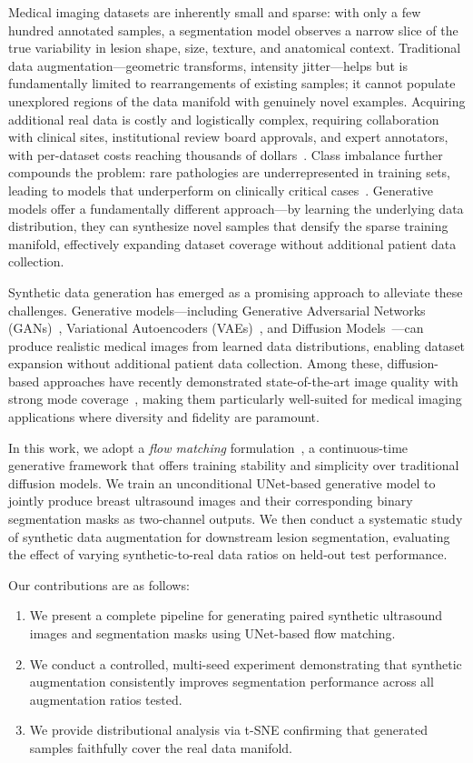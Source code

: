 \documentclass[twocolumn]{article}
\begin{document}
Medical imaging datasets are inherently small and sparse: with only a few hundred annotated samples, a segmentation model observes a narrow slice of the true variability in lesion shape, size, texture, and anatomical context. Traditional data augmentation---geometric transforms, intensity jitter---helps but is fundamentally limited to rearrangements of existing samples; it cannot populate unexplored regions of the data manifold with genuinely novel examples. Acquiring additional real data is costly and logistically complex, requiring collaboration with clinical sites, institutional review board approvals, and expert annotators, with per-dataset costs reaching thousands of dollars~\cite{willemink2020}. Class imbalance further compounds the problem: rare pathologies are underrepresented in training sets, leading to models that underperform on clinically critical cases~\cite{johnson2019}. Generative models offer a fundamentally different approach---by learning the underlying data distribution, they can synthesize novel samples that densify the sparse training manifold, effectively expanding dataset coverage without additional patient data collection.

Synthetic data generation has emerged as a promising approach to alleviate these challenges. Generative models---including Generative Adversarial Networks (GANs)~\cite{goodfellow2014}, Variational Autoencoders (VAEs)~\cite{kingma2014}, and Diffusion Models~\cite{ho2020}---can produce realistic medical images from learned data distributions, enabling dataset expansion without additional patient data collection. Among these, diffusion-based approaches have recently demonstrated state-of-the-art image quality with strong mode coverage~\cite{dhariwal2021}, making them particularly well-suited for medical imaging applications where diversity and fidelity are paramount.

In this work, we adopt a \emph{flow matching} formulation~\cite{lipman2023}, a continuous-time generative framework that offers training stability and simplicity over traditional diffusion models. We train an unconditional UNet-based generative model to jointly produce breast ultrasound images and their corresponding binary segmentation masks as two-channel outputs. We then conduct a systematic study of synthetic data augmentation for downstream lesion segmentation, evaluating the effect of varying synthetic-to-real data ratios on held-out test performance.

Our contributions are as follows:
\begin{enumerate}
    \item We present a complete pipeline for generating paired synthetic ultrasound images and segmentation masks using UNet-based flow matching.
    \item We conduct a controlled, multi-seed experiment demonstrating that synthetic augmentation consistently improves segmentation performance across all augmentation ratios tested.
    \item We provide distributional analysis via t-SNE confirming that generated samples faithfully cover the real data manifold.
\end{enumerate}
\end{document}
